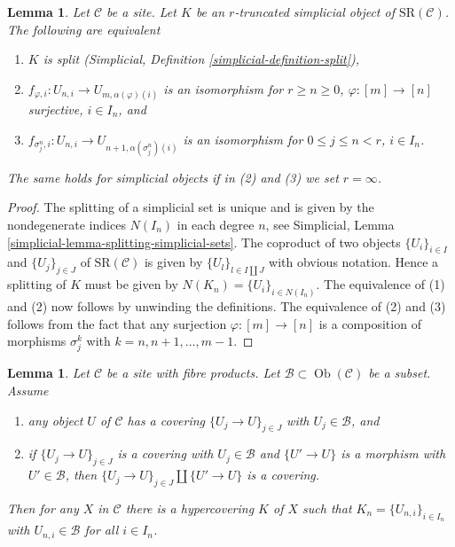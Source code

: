 \documentclass{stacks-project}
\theoremstyle{plain}
\newtheorem{lemma}[subsection]{Lemma}
\theoremstyle{definition}
\theoremstyle{remark}
\numberwithin{equation}{subsection}
\def\Ob{\mathop{\mathrm{Ob}}\nolimits}
\begin{document}
\begin{lemma}
\label{lemma-split}
Let $\mathcal{C}$ be a site. Let $K$ be an $r$-truncated simplicial object
of $\text{SR}(\mathcal{C})$. The following are equivalent
\begin{enumerate}
\item $K$ is split (Simplicial, Definition \ref{simplicial-definition-split}),
\item $f_{\varphi, i} : U_{n, i} \to U_{m, \alpha(\varphi)(i)}$
is an isomorphism for $r \geq n \geq 0$,
$\varphi : [m] \to [n]$ surjective, $i \in I_n$, and
\item $f_{\sigma^n_j, i} : U_{n, i} \to U_{n + 1, \alpha(\sigma^n_j)(i)}$
is an isomorphism for $0 \leq j \leq n < r$, $i \in I_n$.
\end{enumerate}
The same holds for simplicial objects if in (2) and (3)
we set $r = \infty$.
\end{lemma}

\begin{proof}
The splitting of a simplicial set is unique and is given by
the nondegenerate indices $N(I_n)$ in each degree $n$, see
Simplicial, Lemma \ref{simplicial-lemma-splitting-simplicial-sets}.
The coproduct of two objects $\{U_i\}_{i \in I}$ and $\{U_j\}_{j \in J}$
of $\text{SR}(\mathcal{C})$ is given by $\{U_l\}_{l \in I \amalg J}$
with obvious notation. Hence a splitting of $K$ must be given by
$N(K_n) = \{U_i\}_{i \in N(I_n)}$. The equivalence of (1) and (2)
now follows by unwinding the definitions. The equivalence of (2)
and (3) follows from the fact that any surjection
$\varphi : [m] \to [n]$ is a composition of morphisms
$\sigma^k_j$ with $k = n, n + 1, \ldots, m - 1$.
\end{proof}

\begin{lemma}
\label{lemma-hypercovering-object}
Let $\mathcal{C}$ be a site with fibre products.
Let $\mathcal{B} \subset \Ob(\mathcal{C})$ be a subset.
Assume
\begin{enumerate}
\item any object $U$ of $\mathcal{C}$ has a covering
$\{U_j \to U\}_{j \in J}$ with $U_j \in \mathcal{B}$, and
\item if $\{U_j \to U\}_{j \in J}$ is a covering
with $U_j \in \mathcal{B}$ and $\{U' \to U\}$ is a morphism with
$U' \in \mathcal{B}$, then $\{U_j \to U\}_{j \in J} \amalg \{U' \to U\}$
is a covering.
\end{enumerate}
Then for any $X$ in $\mathcal{C}$ there is a hypercovering $K$
of $X$ such that $K_n = \{U_{n, i}\}_{i \in I_n}$
with $U_{n, i} \in \mathcal{B}$ for all $i \in I_n$.
\end{lemma}
\end{document}
